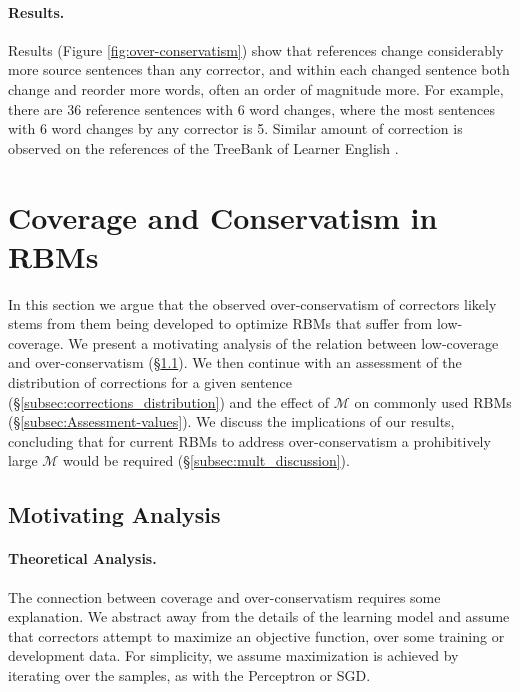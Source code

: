 \documentclass[letterpaper, 11pt]{article}
\begin{document}
\paragraph{Results.}
Results (Figure \ref{fig:over-conservatism}) show that references change considerably more source sentences than any corrector, and within each changed sentence both change and reorder more words, often an order of magnitude more. For example, there are 36 reference sentences with 6 word changes, where the most sentences with 6 word changes by any corrector is 5.
Similar amount of correction is observed on the references of the TreeBank of Learner English \cite{yannakoudakis2011new}.
%
%
\section{Coverage and Conservatism in RBMs}\label{sec:increase-reference}
%
In this section we argue that the observed over-conservatism of correctors likely stems
from them being developed to optimize RBMs that suffer from low-coverage.
We present a motivating analysis of the relation between low-coverage and over-conservatism (\S \ref{subsec:motivating_analysis}). We then continue with an assessment of the distribution of corrections for a given sentence (\S \ref{subsec:corrections_distribution})
and the effect of $\mathcal{M}$ on commonly used RBMs (\S \ref{subsec:Assessment-values}).
We discuss the implications of our results, concluding that for current RBMs  
to address over-conservatism a prohibitively large $\mathcal{M}$ would be required (\S \ref{subsec:mult_discussion}).

\subsection{Motivating Analysis}\label{subsec:motivating_analysis}

\paragraph{Theoretical Analysis.}
The connection between coverage and over-conservatism requires some explanation.
We abstract away from the details of the learning model and assume that correctors attempt to maximize an objective function, 
over some training or development data. For simplicity, we assume maximization is achieved by iterating 
over the samples, as with the Perceptron or SGD.
\end{document}

